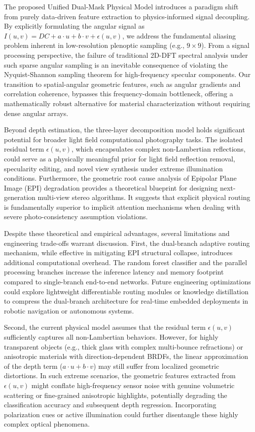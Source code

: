 The proposed Unified Dual-Mask Physical Model introduces a paradigm shift from purely data-driven feature extraction to physics-informed signal decoupling. By explicitly formulating the angular signal as $I(u,v) = DC + a\cdot u + b\cdot v + \epsilon(u,v)$, we address the fundamental aliasing problem inherent in low-resolution plenoptic sampling (e.g., $9 \times 9$). From a signal processing perspective, the failure of traditional 2D-DFT spectral analysis under such sparse angular sampling is an inevitable consequence of violating the Nyquist-Shannon sampling theorem for high-frequency specular components. Our transition to spatial-angular geometric features, such as angular gradients and correlation coherence, bypasses this frequency-domain bottleneck, offering a mathematically robust alternative for material characterization without requiring dense angular arrays.

Beyond depth estimation, the three-layer decomposition model holds significant potential for broader light field computational photography tasks. The isolated residual term $\epsilon(u,v)$, which encapsulates complex non-Lambertian reflections, could serve as a physically meaningful prior for light field reflection removal, specularity editing, and novel view synthesis under extreme illumination conditions. Furthermore, the geometric root cause analysis of Epipolar Plane Image (EPI) degradation provides a theoretical blueprint for designing next-generation multi-view stereo algorithms. It suggests that explicit physical routing is fundamentally superior to implicit attention mechanisms when dealing with severe photo-consistency assumption violations.

Despite these theoretical and empirical advantages, several limitations and engineering trade-offs warrant discussion. First, the dual-branch adaptive routing mechanism, while effective in mitigating EPI structural collapse, introduces additional computational overhead. The random forest classifier and the parallel processing branches increase the inference latency and memory footprint compared to single-branch end-to-end networks. Future engineering optimizations could explore lightweight differentiable routing modules or knowledge distillation to compress the dual-branch architecture for real-time embedded deployments in robotic navigation or autonomous systems. 

Second, the current physical model assumes that the residual term $\epsilon(u,v)$ sufficiently captures all non-Lambertian behaviors. However, for highly transparent objects (e.g., thick glass with complex multi-bounce refractions) or anisotropic materials with direction-dependent BRDFs, the linear approximation of the depth term ($a\cdot u + b\cdot v$) may still suffer from localized geometric distortions. In such extreme scenarios, the geometric features extracted from $\epsilon(u,v)$ might conflate high-frequency sensor noise with genuine volumetric scattering or fine-grained anisotropic highlights, potentially degrading the classification accuracy and subsequent depth regression. Incorporating polarization cues or active illumination could further disentangle these highly complex optical phenomena.

